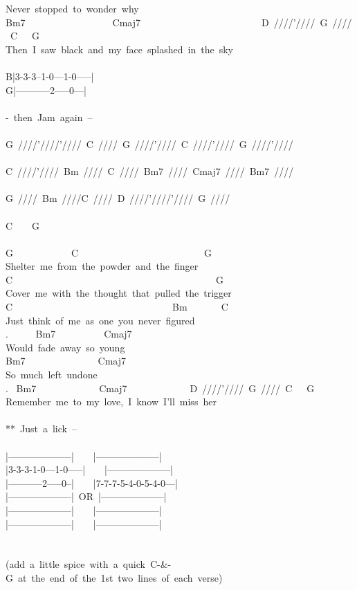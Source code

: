 {Never\ stopped\ to\ wonder\ why\\
Bm7\ \ \ \ \ \ \ \ \ \ \ \ \ \ \ \ \ \ Cmaj7\ \ \ \ \ \ \ \ \ \ \ \ \ \ \ \ \ \ \ \ \ \ \ \ \ D\ ////'////\ G\ ////\ C\ \ \ G\\
Then\ I\ saw\ black\ and\ my\ face\ splashed\ in\ the\ sky\\
\\
B|3-3-3--1-0---1-0-----|\\
G|-----------2-----0---|\\
\\
-\ then\ Jam\ again\ --\\
\\
G\ ////'////'////\ C\ ////\ G\ ////'////\ C\ ////'////\ G\ ////'////\\
\\
C\ ////'////\ Bm\ ////\ C\ ////\ Bm7\ ////\ Cmaj7\ ////\ Bm7\ ////\\
\\
G\ ////\ Bm\ ////C\ ////\ D\ ////'////'////\ G\ ////\\
\\
C\ \ \ \ G\\
\\
G\ \ \ \ \ \ \ \ \ \ \ \ C\ \ \ \ \ \ \ \ \ \ \ \ \ \ \ \ \ \ \ \ \ \ \ \ \ \ G\\
Shelter\ me\ from\ the\ powder\ and\ the\ finger\\
C\ \ \ \ \ \ \ \ \ \ \ \ \ \ \ \ \ \ \ \ \ \ \ \ \ \ \ \ \ \ \ \ \ \ \ \ \ \ \ \ \ \ G\\
Cover\ me\ with\ the\ thought\ that\ pulled\ the\ trigger\\
C\ \ \ \ \ \ \ \ \ \ \ \ \ \ \ \ \ \ \ \ \ \ \ \ \ \ \ \ \ \ \ \ \ Bm\ \ \ \ \ \ \ C\\
Just\ think\ of\ me\ as\ one\ you\ never\ figured\\
. \ \ \ \ \ Bm7\ \ \ \ \ \ \ \ \ \ Cmaj7\\
Would\ fade\ away\ so\ young\\
Bm7\ \ \ \ \ \ \ \ \ \ \ \ \ \ \ Cmaj7\\
So\ much\ left\ undone\\
. \ Bm7\ \ \ \ \ \ \ \ \ \ \ \ \ Cmaj7\ \ \ \ \ \ \ \ \ \ \ \ \ D\ ////'////\ G\ ////\ C\ \ \ G\\
Remember\ me\ to\ my\ love,\ I\ know\ I'll\ miss\ her\\
\\
**\ Just\ a\ lick\ --\\
\\
|--------------------|\ \ \ \ |--------------------|\\
|3-3-3-1-0---1-0-----|\ \ \ \ |--------------------|\\
|-----------2-----0--|\ \ \ \ |7-7-7-5-4-0-5-4-0---|\\
|--------------------|\ OR\ |--------------------|\\
|--------------------|\ \ \ \ |--------------------|\\
|--------------------|\ \ \ \ |--------------------|\\
\\
\\
(add\ a\ little\ spice\ with\ a\ quick\ C-\&-G\ at\ the\ end\ of\ the\ 1st\ two\ lines\ of\ each\ verse)\ }
